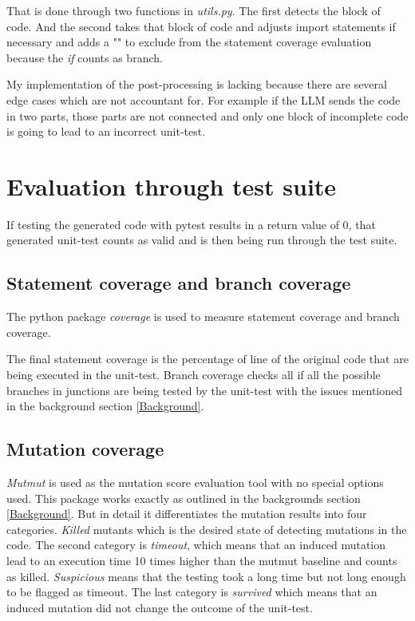 \documentclass[a4paper,11pt,oneside]{memoir}
\begin{document}
\text
That is done through two functions in \textit{utils.py}. The first detects the block of code. And the second takes that block of code and adjusts import statements if necessary and adds a "\textit{}" to exclude \textit{} from the statement coverage evaluation because the \textit{if} counts as branch.   

My implementation of the post-processing is lacking because there are several edge cases which are not accountant for. For example if the LLM sends the code in two parts, those parts are not connected and only one block of incomplete code is going to lead to an incorrect unit-test.

\section{Evaluation through test suite}
If testing the generated code with pytest results in a return value of 0, that generated unit-test counts as valid and is then being run through the test suite.

\subsection{Statement coverage and branch coverage}
The python package \textit{coverage} is used to measure statement coverage and branch coverage.

The final statement coverage is the percentage of line of the original code that are being executed in the unit-test.
Branch coverage checks all if all the possible branches in junctions are being tested by the unit-test with the issues mentioned in the background section \ref{Background}.

\subsection{Mutation coverage}
\textit{Mutmut} is used as the mutation score evaluation tool with no special options used. This package works exactly as outlined in the backgrounds section \ref{Background}. But in detail it differentiates the mutation results into four categories. \textit{Killed} mutants which is the desired state of detecting mutations in the code. The second category is \textit{timeout}, which means that an induced mutation lead to an execution time 10 times higher than the mutmut baseline and counts as killed. \textit{Suspicious} means that the testing took a long time but not long enough to be flagged as timeout. The last category is \textit{survived} which means that an induced mutation did not change the outcome of the unit-test. 
\end{document}
